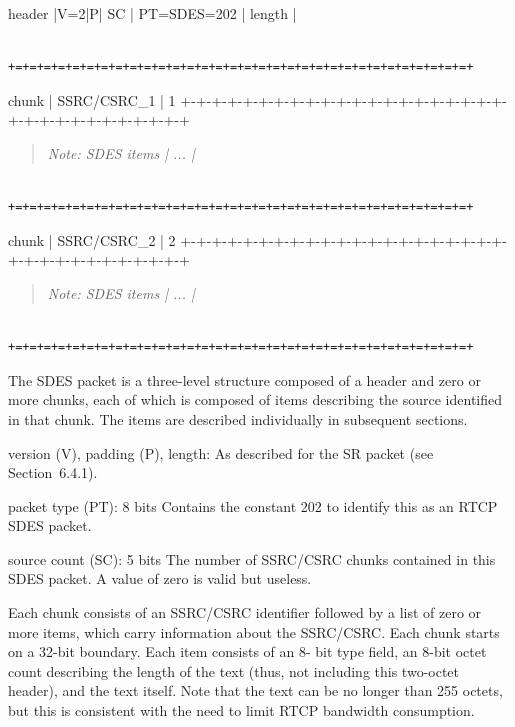 \documentclass{article}
\begin{document}
header |V=2|P|    SC   |  PT=SDES=202  |             length            |

\begin{verbatim}
       +=+=+=+=+=+=+=+=+=+=+=+=+=+=+=+=+=+=+=+=+=+=+=+=+=+=+=+=+=+=+=+=+
\end{verbatim}

chunk  |                          SSRC/CSRC\_1                          | 1    +-+-+-+-+-+-+-+-+-+-+-+-+-+-+-+-+-+-+-+-+-+-+-+-+-+-+-+-+-+-+-+-+

\begin{quote}
\textit{Note: SDES items                          | ...                              |}
\end{quote}

\begin{verbatim}
       +=+=+=+=+=+=+=+=+=+=+=+=+=+=+=+=+=+=+=+=+=+=+=+=+=+=+=+=+=+=+=+=+
\end{verbatim}

chunk  |                          SSRC/CSRC\_2                          | 2    +-+-+-+-+-+-+-+-+-+-+-+-+-+-+-+-+-+-+-+-+-+-+-+-+-+-+-+-+-+-+-+-+

\begin{quote}
\textit{Note: SDES items                          | ...                              |}
\end{quote}

\begin{verbatim}
       +=+=+=+=+=+=+=+=+=+=+=+=+=+=+=+=+=+=+=+=+=+=+=+=+=+=+=+=+=+=+=+=+
\end{verbatim}

The SDES packet is a three-level structure composed of a header and zero or more chunks, each of which is composed of items describing the source identified in that chunk.  The items are described individually in subsequent sections.

version (V), padding (P), length: As described for the SR packet (see Section~6.4.1).

packet type (PT): 8 bits Contains the constant 202 to identify this as an RTCP SDES packet.

source count (SC): 5 bits The number of SSRC/CSRC chunks contained in this SDES packet.  A value of zero is valid but useless.

Each chunk consists of an SSRC/CSRC identifier followed by a list of zero or more items, which carry information about the SSRC/CSRC. Each chunk starts on a 32-bit boundary.  Each item consists of an 8- bit type field, an 8-bit octet count describing the length of the text (thus, not including this two-octet header), and the text itself.  Note that the text can be no longer than 255 octets, but this is consistent with the need to limit RTCP bandwidth consumption.
\end{document}
